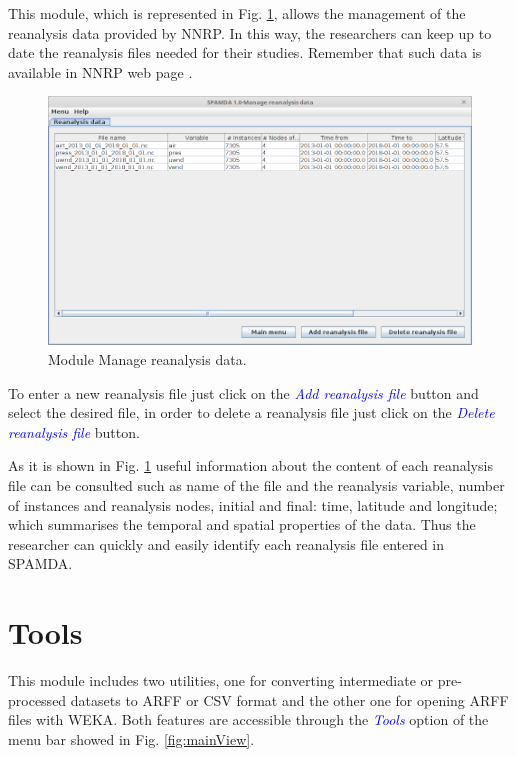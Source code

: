 \begin{onehalfspace}
			This module, which is represented in Fig. \ref{fig:manageReanalysisData}, allows the management of the reanalysis data provided by NNRP. In this way, the researchers can keep up to date the reanalysis files needed for their studies. Remember that such data is available in NNRP web page \cite{NNRP}.
				\begin{figure}[ht!]
					\centering
					\includegraphics[scale=0.40]{figures/manageReanalysisData.png}
					\caption{Module Manage reanalysis data.}
					\label{fig:manageReanalysisData}
				\end{figure}
			
			To enter a new reanalysis file just click on the \textcolor{blue}{\textit{Add reanalysis file}} button and select the desired file, in order to delete a reanalysis file just click on the \textcolor{blue}{\textit{Delete reanalysis file}} button.
			
			As it is shown in Fig. \ref{fig:manageReanalysisData} useful information about the content of each reanalysis file can be consulted such as name of the file and the reanalysis variable, number of instances and reanalysis nodes, initial and final: time, latitude and longitude; which summarises the temporal and spatial properties of the data. Thus the researcher can quickly and easily identify each reanalysis file entered in SPAMDA.
		
		\section{Tools}
		
			This module includes two utilities, one for converting intermediate or pre-processed datasets to ARFF or CSV format and the other one for opening ARFF files with WEKA. Both features are accessible through the \textcolor{blue}{\textit{Tools}} option of the menu bar showed in Fig. \ref{fig:mainView}.
			

\end{onehalfspace}

